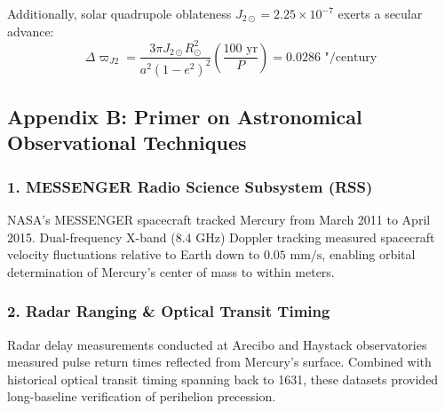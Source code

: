 \documentclass[11pt,a4paper]{article}
\begin{document}
Additionally, solar quadrupole oblateness $J_{2\odot} = 2.25 \times 10^{-7}$ exerts a secular advance:
\begin{equation}
\Delta \varpi_{J2} = \frac{3 \pi J_{2\odot} R_{\odot}^2}{a^2 (1 - e^2)^2} \left( \frac{100\text{ yr}}{P} \right) = 0.0286\text{ "/century}
\end{equation}

\subsection*{Appendix B: Primer on Astronomical Observational Techniques}

\subsubsection*{1. MESSENGER Radio Science Subsystem (RSS)}
NASA's MESSENGER spacecraft tracked Mercury from March 2011 to April 2015. Dual-frequency X-band ($8.4\text{ GHz}$) Doppler tracking measured spacecraft velocity fluctuations relative to Earth down to $0.05\text{ mm/s}$, enabling orbital determination of Mercury's center of mass to within meters.

\subsubsection*{2. Radar Ranging \& Optical Transit Timing}
Radar delay measurements conducted at Arecibo and Haystack observatories measured pulse return times reflected from Mercury's surface. Combined with historical optical transit timing spanning back to 1631, these datasets provided long-baseline verification of perihelion precession.
\end{document}
